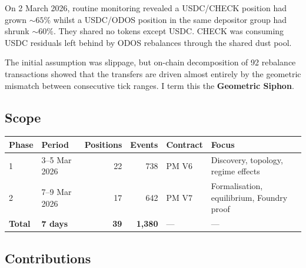 \documentclass[11pt,a4paper]{article}
\begin{document}
On 2 March 2026, routine monitoring revealed a USDC/CHECK position had grown ${\sim}65\%$ whilst a USDC/ODOS position in the same depositor group had shrunk ${\sim}60\%$. They shared no tokens except USDC. CHECK was consuming USDC residuals left behind by ODOS rebalances through the shared dust pool.

The initial assumption was slippage, but on-chain decomposition of 92 rebalance transactions showed that the transfers are driven almost entirely by the geometric mismatch between consecutive tick ranges. I term this the \textbf{Geometric Siphon}.

\subsection{Scope}\label{sec:scope}

\begin{table}[H]
\centering
\small
\begin{tabular}{@{}llrrll@{}}
\toprule
Phase & Period & Positions & Events & Contract & Focus \\
\midrule
1 & 3--5 Mar 2026 & 22 & 738 & PM V6 & Discovery, topology, regime effects \\
2 & 7--9 Mar 2026 & 17 & 642 & PM V7 & Formalisation, equilibrium, Foundry proof \\
\textbf{Total} & \textbf{7 days} & \textbf{39} & \textbf{1{,}380} & --- & --- \\
\bottomrule
\end{tabular}
\normalsize
\end{table}

\subsection{Contributions}\label{sec:contributions}
\end{document}
